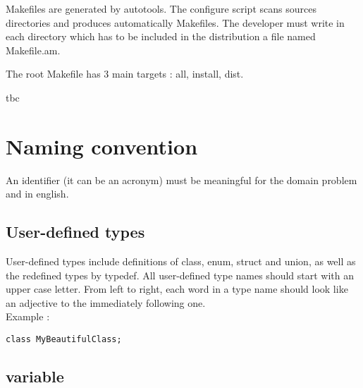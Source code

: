 \documentclass[a4paper,twoside,openright,makeidx,12pt]{report}
\begin{document}
Makefiles are generated by autotools. The configure script scans sources directories and produces automatically Makefiles. 
The developer must write in each directory which has to be included in the distribution a file named Makefile.am.

The root Makefile has 3 main targets : all, install, dist.

\ac{tbc}


\chapter{Naming convention}

An identifier (it can be an acronym) must be meaningful for the domain problem and in english.

\section{User-defined types}

User-defined types include definitions of class, enum, struct and union, as well as the redefined types by typedef. All user-defined type names should start with an upper case letter. From left to right, each word in a type name should look like an adjective to the immediately following one. \\
Example : 
\begin{verbatim}class MyBeautifulClass; \end{verbatim}


\section{variable}
\end{document}
